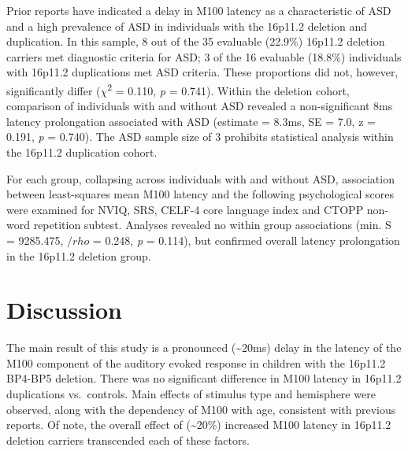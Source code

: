 \documentclass[]{article}
\begin{document}
\medskip

Prior reports have indicated a delay in M100 latency as a characteristic
of ASD and a high prevalence of ASD in individuals with the 16p11.2
deletion and duplication. In this sample, 8 out of the 35 evaluable
(22.9\%) 16p11.2 deletion carriers met diagnostic criteria for ASD; 3 of
the 16 evaluable (18.8\%) individuals with 16p11.2 duplications met ASD
criteria. These proportions did not, however, significantly differ
(\(\chi\)\textsuperscript{2} = 0.110, \emph{p} = 0.741). Within the
deletion cohort, comparison of individuals with and without ASD revealed
a non-significant 8ms latency prolongation associated with ASD (estimate
= 8.3ms, SE = 7.0, z = 0.191, \emph{p} = 0.740). The ASD sample size of
3 prohibits statistical analysis within the 16p11.2 duplication
cohort.\\\medskip

For each group, collapsing across individuals with and without ASD,
association between least-squares mean M100 latency and the following
psychological scores were examined for NVIQ, SRS, CELF-4 core language
index and CTOPP non-word repetition subtest. Analyses revealed no within
group associations (min. S = 9285.475, \(/rho\) = 0.248, \emph{p} =
0.114), but confirmed overall latency prolongation in the 16p11.2
deletion group.\\\medskip

\section{Discussion}\label{discussion}

The main result of this study is a pronounced (\textasciitilde{}20ms)
delay in the latency of the M100 component of the auditory evoked
response in children with the 16p11.2 BP4-BP5 deletion. There was no
significant difference in M100 latency in 16p11.2 duplications
vs.~controls. Main effects of stimulus type and hemisphere were
observed, along with the dependency of M100 with age, consistent with
previous reports. Of note, the overall effect of (\textasciitilde{}20\%)
increased M100 latency in 16p11.2 deletion carriers transcended each of
these factors.

\medskip
\end{document}
